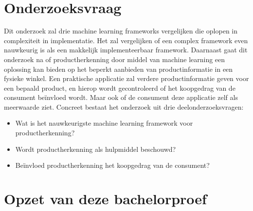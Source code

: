 \section{Onderzoeksvraag}
\label{sec:onderzoeksvraag}

Dit onderzoek zal drie machine learning frameworks vergelijken die oplopen in complexiteit in implementatie. Het zal vergelijken of een complex framework even nauwkeurig is als een makkelijk implementeerbaar framework. Daarnaast gaat dit onderzoek na of productherkenning door middel van machine learning een oplossing kan bieden op het beperkt aanbieden van productinformatie in een fysieke winkel. Een praktische applicatie zal verdere productinformatie geven voor een bepaald product, en hierop wordt gecontroleerd of het koopgedrag van de consument beïnvloed wordt. Maar ook of de consument deze applicatie zelf als meerwaarde ziet. Concreet bestaat het onderzoek uit drie deelonderzoeksvragen:
\begin{itemize}
  \item Wat is het nauwkeurigste machine learning framework voor productherkenning?
  \item Wordt productherkenning als hulpmiddel beschouwd?
  \item Beïnvloed productherkenning het koopgedrag van de consument?
\end{itemize}


\section{Opzet van deze bachelorproef}
\label{sec:opzet-bachelorproef}





